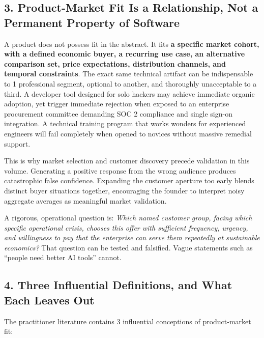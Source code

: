 \subsection*{3. Product-Market Fit Is a Relationship, Not a Permanent Property of Software}

A product does not possess fit in the abstract. It fits \textbf{a specific market cohort, with a defined economic buyer, a recurring use case, an alternative comparison set, price expectations, distribution channels, and temporal constraints}. The exact same technical artifact can be indispensable to 1 professional segment, optional to another, and thoroughly unacceptable to a third. A developer tool designed for solo hackers may achieve immediate organic adoption, yet trigger immediate rejection when exposed to an enterprise procurement committee demanding SOC 2 compliance and single sign-on integration. A technical training program that works wonders for experienced engineers will fail completely when opened to novices without massive remedial support.

This is why market selection and customer discovery precede validation in this volume. Generating a positive response from the wrong audience produces catastrophic false confidence. Expanding the customer aperture too early blends distinct buyer situations together, encouraging the founder to interpret noisy aggregate averages as meaningful market validation.

A rigorous, operational question is: \emph{Which named customer group, facing which specific operational crisis, chooses this offer with sufficient frequency, urgency, and willingness to pay that the enterprise can serve them repeatedly at sustainable economics?} That question can be tested and falsified. Vague statements such as ``people need better AI tools'' cannot.

\subsection*{4. Three Influential Definitions, and What Each Leaves Out}

The practitioner literature contains 3 influential conceptions of product-market fit:


